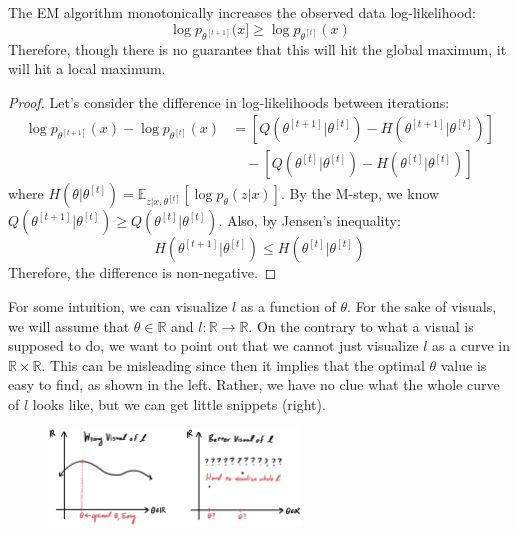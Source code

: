   \begin{theorem}[EM Monotonicity]
    The EM algorithm monotonically increases the observed data log-likelihood:
    \begin{equation}
      \log p_{\theta^{[t+1]}}(x] \geq \log p_{\theta^{[t]}}(x)
    \end{equation}
    Therefore, though there is no guarantee that this will hit the global maximum, it will hit a local maximum. 
  \end{theorem}
  \begin{proof}
    Let's consider the difference in log-likelihoods between iterations:
    \begin{align}
      \log p_{\theta^{[t+1]}}(x) - \log p_{\theta^{[t]}}(x) &= \left[Q(\theta^{[t+1]}|\theta^{[t]}) - H(\theta^{[t+1]}|\theta^{[t]})\right] \\
      &\quad - \left[Q(\theta^{[t]}|\theta^{[t]}) - H(\theta^{[t]}|\theta^{[t]})\right]
    \end{align}
    where $H(\theta|\theta^{[t]}) = \mathbb{E}_{z|x,\theta^{[t]}}[\log p_{\theta}(z|x)]$. By the M-step, we know $Q(\theta^{[t+1]}|\theta^{[t]}) \geq Q(\theta^{[t]}|\theta^{[t]})$. Also, by Jensen's inequality:
    \begin{equation}
      H(\theta^{[t+1]}|\theta^{[t]}) \leq H(\theta^{[t]}|\theta^{[t]})
    \end{equation}
    Therefore, the difference is non-negative.
  \end{proof} 

  For some intuition, we can visualize $l$ as a function of $\theta$. For the sake of visuals, we will assume that $\theta \in \mathbb{R}$ and $l: \mathbb{R} \longrightarrow \mathbb{R}$. On the contrary to what a visual is supposed to do, we want to point out that we cannot just visualize $l$ as a curve in $\mathbb{R} \times \mathbb{R}$. This can be misleading since then it implies that the optimal $\theta$ value is easy to find, as shown in the left. Rather, we have no clue what the whole curve of $l$ looks like, but we can get little snippets (right). 

  \begin{figure}[H]
    \centering 
    \includegraphics[width=0.6\textwidth]{img/visual_of_l.jpg}
    \caption{} 
    \label{fig:visual_of_l}
  \end{figure}

